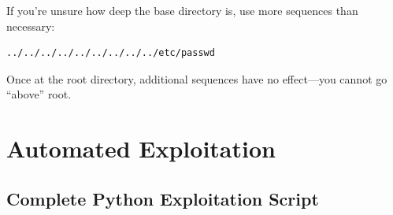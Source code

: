 \documentclass[11pt,letterpaper]{article}
\newcommand{\inlinecode}[1]{\texttt{\detokenize{#1}}}
\begin{document}
\begin{notebox}
If you're unsure how deep the base directory is, use more \inlinecode{../} sequences than necessary:
\begin{verbatim}
../../../../../../../../../etc/passwd
\end{verbatim}
Once at the root directory, additional \inlinecode{../} sequences have no effect---you cannot go ``above'' root.
\end{notebox}

\section{Automated Exploitation}

\subsection{Complete Python Exploitation Script}
\end{document}
